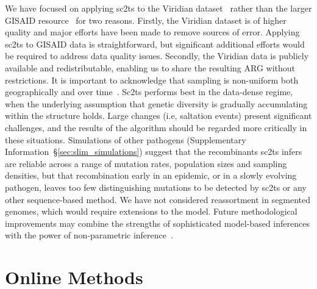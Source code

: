 \documentclass[12pt]{article}
\newcommand{\supref}[1]{Supplementary Information~\S\ref{#1}}
\begin{document}
We have focused on applying sc2ts to the Viridian dataset~\cite{Hunt2026} rather
than the larger GISAID resource~\cite{Shu2017} for two reasons.
Firstly, the Viridian dataset is of higher quality and major efforts
have been made to remove sources of error. Applying sc2ts to
GISAID data is straightforward, but significant additional efforts
would be required to address data quality issues.
Secondly, the Viridian data is publicly available and redistributable,
enabling us to share the resulting ARG without restrictions.
It is important to acknowledge that sampling is non-uniform both
geographically and over time~\cite{Lancet2021,Chen2022}.
Sc2ts performs best in the data-dense regime, when the underlying
assumption that genetic diversity is gradually accumulating within
the structure holds. Large changes (i.e, saltation events) present
significant challenges, and the results of the algorithm should
be regarded more critically in these situations.
Simulations of other pathogens (\supref{sec:slim_simulations})
suggest that the recombinants sc2ts infers are reliable
across a range of mutation rates, population sizes and sampling densities,
but that recombination early in an epidemic, or in a slowly evolving pathogen,
leaves too few distinguishing mutations to be detected by sc2ts
or any other sequence-based method.
We have not considered reassortment in segmented genomes,
which would require extensions to the model.
Future methodological improvements may combine the strengths
of sophisticated model-based inferences with the power
of non-parametric inference~\cite{Bisschop2025likelihoods}.

\clearpage %

\section*{Online Methods}
\end{document}
